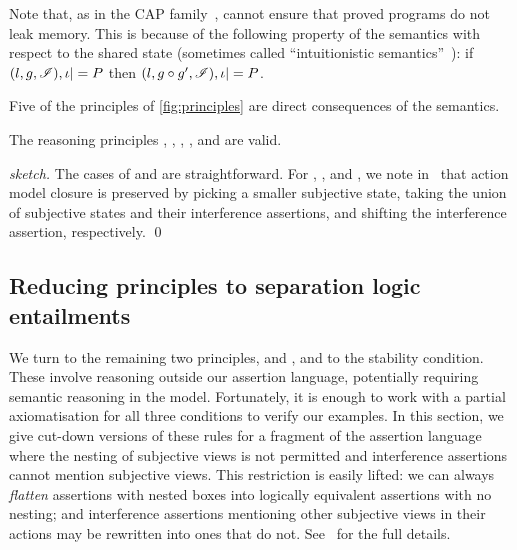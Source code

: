 Note that, as in the CAP family~\cite{cap-ecoop10,icap,tada}, \colosl
cannot ensure that proved programs do not leak memory. This is because
of the following property of the semantics with respect to the shared
state (sometimes called ``intuitionistic semantics''~\cite{rey02}): if
$(l,g,\mathscr{I}), \iota |= P$ then $(l,g\circ g',\mathscr{I}), \iota |= P$.


Five of the principles of \fig\ref{fig:principles} are direct
consequences of the semantics.

\begin{lemma}
  \label{lem:assertion-facts}
  The \colosl reasoning principles 
  \forgetRule, \mergeRule, \shiftRule, \weakenRule, and \copyRule are valid.
\end{lemma}
\begin{proof}[sketch]
  The cases of \weakenRule and \copyRule are straightforward. For
  \forgetRule, \mergeRule, and \shiftRule, we note
  in~\cite{colosl-tr14} that action model closure is preserved by
  picking a smaller subjective state, taking the union of subjective
  states and their interference assertions, and shifting the
  interference assertion, respectively.
  \qed
\end{proof}


\subsection{Reducing \colosl principles to separation logic entailments}
\label{subsec:prules}



We turn to the remaining two principles, \extendRule and \shiftRule,
and to the stability condition. These involve reasoning outside our
assertion language, potentially requiring semantic reasoning 
in the model. Fortunately, it is enough to work
with a partial 
axiomatisation  for all three conditions to verify
our examples. In this section, we give cut-down versions of these
rules for a fragment of the \colosl assertion language where the 
nesting of subjective views is not permitted   and  interference
assertions cannot mention subjective views. This restriction is easily
lifted: we can always \emph{flatten}
assertions with nested boxes into logically equivalent assertions with
no nesting; and  interference assertions  mentioning  other
subjective views in their actions may be rewritten into ones
that do not.  See~\cite{colosl-tr14} for the full details.%

